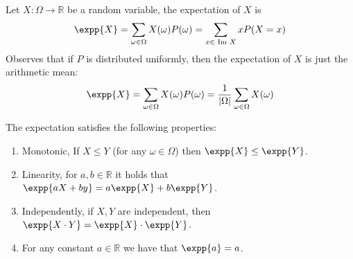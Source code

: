 \begin{definition}
  Let $X : \Omega\rightarrow \mathbb{R}$ be a random variable, the expectation of $X$ is 
  \begin{equation*}
    \begin{split}
      \expp{X} = \sum_{\omega\in \Omega}{X(\omega)P(\omega)} = \sum_{x \in \image X}{ x P(X = x)} 
    \end{split}
  \end{equation*} Observes that if $P$ is distributed uniformly, then the expectation of $X$ is just the arithmetic mean: \begin{equation*}
    \begin{split}
      \expp{X} = \sum_{\omega\in \Omega}{X(\omega)P(\omega)} =  \frac{1}{|\Omega|}\sum_{\omega\in \Omega}{X(\omega)}  
    \end{split}
  \end{equation*}
\end{definition}

\begin{claim}
   The expectation satisfies the following properties:
   \begin{enumerate}
     \item Monotonic, If $X \le Y$ (for any $\omega \in \Omega$) then $\expp{X} \le \expp{Y}$.   
     \item Linearity, for $a,b \in \mathbb{R}$ it holds that $\expp{aX + by} = a\expp{X} + b \expp{Y}$.   
     \item Independently, if $X,Y$ are independent, then $\expp{X\cdot Y} = \expp{X}\cdot \expp{Y}$.  
     \item For any constant $a \in \mathbb{R}$ we have that $\expp{a} = a$. 
   \end{enumerate}
\end{claim}

